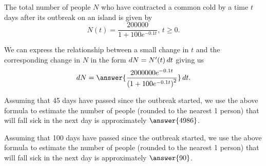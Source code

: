 \documentclass{ximera}
\author{Nela Lakos \and Kyle Parsons}
\begin{document}
\begin{exercise}

The total number of people $N$ who have contracted a common cold by a time $t$ days after its outbreak on an island is given by
\[
N(t) = \frac{200000}{1+100e^{-0.1t}},\,t\geq0.
\]

We can express the relationship between a small change in $t$ and the corresponding change in $N$ in the form $\mathop{}\!d{N} = N'(t)\mathop{}\!d{t}$ giving us
\[
\d{N} = \answer{\frac{2000000e^{-0.1t}}{\left(1+100e^{-0.1t}\right)^2}}\d{t}.
\]

Assuming that 45 days have passed since the outbreak started, we use the above formula to estimate the number of people (rounded to the nearest 1 person) that will fall sick in the next day is approximately $\answer{4986}$.

Assuming that 100 days have passed since the outbreak started, we use the above formula to estimate the number of people (rounded to the nearest 1 person) that will fall sick in the next day is approximately $\answer{90}$.

\end{exercise}
\end{document}
